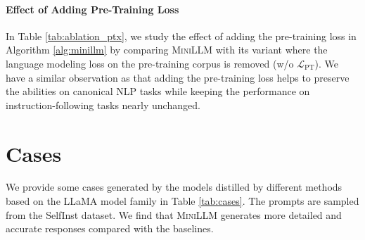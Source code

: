 \documentclass{article}
\begin{document}
\paragraph{Effect of Adding Pre-Training Loss} In Table \ref{tab:ablation_ptx}, we study the effect of adding the pre-training loss in Algorithm \ref{alg:minillm} by comparing \textsc{MiniLLM} with its variant where the language modeling loss on the pre-training corpus is removed (w/o $\mathcal{L}_{\text{PT}}$). We have a similar observation as \cite{instruct-gpt} that adding the pre-training loss helps to preserve the abilities on canonical NLP tasks while keeping the performance on instruction-following tasks nearly unchanged.

\section{Cases}
We provide some cases generated by the models distilled by different methods based on the LLaMA model family in Table \ref{tab:cases}. The prompts are sampled from the SelfInst dataset. We find that \textsc{MiniLLM} generates more detailed and accurate responses compared with the baselines.
\end{document}

